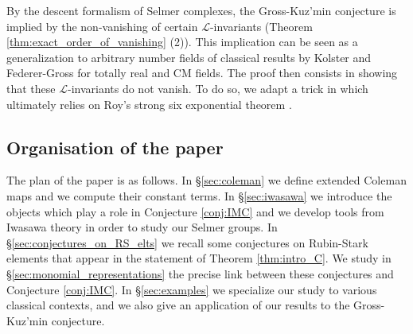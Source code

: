 \documentclass[12pt]{amsart}
\newcommand\cL{\mathcal{L}}
\newcommand\finir{{\color{red} A finir ! }}
\theoremstyle{defstyle}
\theoremstyle{thmstyle}
\newtheorem{THM}{Theorem}
\begin{document}
 By the descent formalism of Selmer complexes, the Gross-Kuz'min conjecture is implied by the non-vanishing of certain $\cL$-invariants (Theorem \ref{thm:exact_order_of_vanishing} (2)). This implication can be seen as a generalization to arbitrary number fields of classical results by Kolster and Federer-Gross for totally real and CM fields. The proof then consists in showing that these $\cL$-invariants do not vanish. To do so, we adapt a trick in \cite{betinadimitrovKatz} which ultimately relies on Roy's strong six exponential theorem \cite{roy}. 


\subsection{Organisation of the paper}
The plan of the paper is as follows. In \S\ref{sec:coleman} we define extended Coleman maps and we compute their constant terms. In \S\ref{sec:iwasawa} we introduce the objects which play a role in Conjecture \ref{conj:IMC} and we develop tools from Iwasawa theory in order to study our Selmer groups. In \S\ref{sec:conjectures_on_RS_elts} we recall some conjectures on Rubin-Stark elements that appear in the statement of Theorem \ref{thm:intro_C}. We study in \S\ref{sec:monomial_representations} the precise link between these conjectures and Conjecture \ref{conj:IMC}. In \S\ref{sec:examples} we specialize our study to various classical contexts, and we also give an application of our results to the Gross-Kuz'min conjecture.
\end{document}
